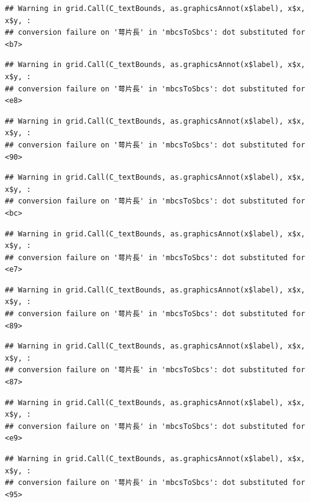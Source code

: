 \documentclass[
]{book}
\begin{document}
\begin{verbatim}
## Warning in grid.Call(C_textBounds, as.graphicsAnnot(x$label), x$x, x$y, :
## conversion failure on '萼片長' in 'mbcsToSbcs': dot substituted for <b7>
\end{verbatim}

\begin{verbatim}
## Warning in grid.Call(C_textBounds, as.graphicsAnnot(x$label), x$x, x$y, :
## conversion failure on '萼片長' in 'mbcsToSbcs': dot substituted for <e8>
\end{verbatim}

\begin{verbatim}
## Warning in grid.Call(C_textBounds, as.graphicsAnnot(x$label), x$x, x$y, :
## conversion failure on '萼片長' in 'mbcsToSbcs': dot substituted for <90>
\end{verbatim}

\begin{verbatim}
## Warning in grid.Call(C_textBounds, as.graphicsAnnot(x$label), x$x, x$y, :
## conversion failure on '萼片長' in 'mbcsToSbcs': dot substituted for <bc>
\end{verbatim}

\begin{verbatim}
## Warning in grid.Call(C_textBounds, as.graphicsAnnot(x$label), x$x, x$y, :
## conversion failure on '萼片長' in 'mbcsToSbcs': dot substituted for <e7>
\end{verbatim}

\begin{verbatim}
## Warning in grid.Call(C_textBounds, as.graphicsAnnot(x$label), x$x, x$y, :
## conversion failure on '萼片長' in 'mbcsToSbcs': dot substituted for <89>
\end{verbatim}

\begin{verbatim}
## Warning in grid.Call(C_textBounds, as.graphicsAnnot(x$label), x$x, x$y, :
## conversion failure on '萼片長' in 'mbcsToSbcs': dot substituted for <87>
\end{verbatim}

\begin{verbatim}
## Warning in grid.Call(C_textBounds, as.graphicsAnnot(x$label), x$x, x$y, :
## conversion failure on '萼片長' in 'mbcsToSbcs': dot substituted for <e9>
\end{verbatim}

\begin{verbatim}
## Warning in grid.Call(C_textBounds, as.graphicsAnnot(x$label), x$x, x$y, :
## conversion failure on '萼片長' in 'mbcsToSbcs': dot substituted for <95>
\end{verbatim}
\end{document}
